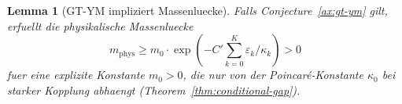 \documentclass[12pt,a4paper]{article}
\theoremstyle{definition}
\theoremstyle{plain}
\newtheorem{lemma}[definition]{Lemma}
\theoremstyle{remark}
\begin{document}
\begin{lemma}[GT-YM impliziert Massenluecke]\label{lem:gt-massgap}
Falls Conjecture~\ref{ax:gt-ym} gilt, erfuellt die physikalische Massenluecke
\begin{equation}
  m_{\mathrm{phys}} \geq m_0 \cdot \exp\!\left(-C' \sum_{k=0}^{K} \varepsilon_k / \kappa_k\right) > 0
\end{equation}
fuer eine explizite Konstante $m_0 > 0$, die nur von der Poincar\'e-Konstante $\kappa_0$ bei starker Kopplung abhaengt (Theorem~\ref{thm:conditional-gap}).
\end{lemma}

\end{document}
